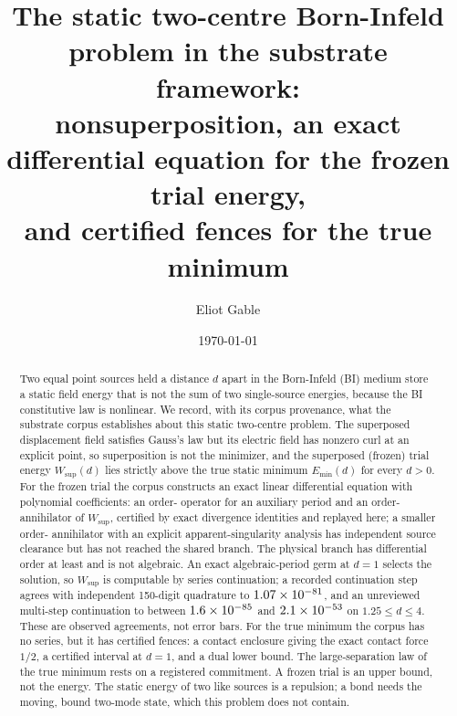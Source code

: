 \documentclass[aps,prd,onecolumn,amsmath,amssymb,longbibliography,floatfix,nofootinbib]{revtex4-2}
\newcommand{\Wsup}{W_{\mathrm{sup}}}
\newcommand{\Emin}{E_{\min}}
\begin{document}
\title{The static two-centre Born-Infeld problem in the substrate framework:\\
nonsuperposition, an exact differential equation for the frozen trial energy,\\
and certified fences for the true minimum}

\author{Eliot Gable}

\date{\today}

\begin{abstract}
Two equal point sources held a distance $d$ apart in the Born-Infeld (BI) medium store a static field energy that is not the sum of two single-source energies, because the BI constitutive law is nonlinear. We record, with its corpus provenance, what the substrate corpus establishes about this static two-centre problem. The superposed displacement field satisfies Gauss's law but its electric field has nonzero curl at an explicit point, so superposition is not the minimizer, and the superposed (frozen) trial energy $\Wsup(d)$ lies strictly above the true static minimum $\Emin(d)$ for every $d>0$. For the frozen trial the corpus constructs an exact linear differential equation with polynomial coefficients: an order-\ScalarOrderVal{} operator for an auxiliary period and an order-\EnergyOrderVal{} annihilator of $\Wsup$, certified by exact divergence identities and replayed here; a smaller order-\OrderSeventeenVal{} annihilator with an explicit apparent-singularity analysis has independent source clearance but has not reached the shared branch. The physical branch has differential order at least \SelectedLowerVal{} and is not algebraic. An exact algebraic-period germ at $d=1$ selects the solution, so $\Wsup$ is computable by series continuation; a recorded continuation step agrees with independent 150-digit quadrature to $1.07\times10^{-81}$, and an unreviewed multi-step continuation to between $1.6\times10^{-85}$ and $2.1\times10^{-53}$ on $1.25\le d\le4$. These are observed agreements, not error bars. For the true minimum the corpus has no series, but it has certified fences: a contact enclosure giving the exact contact force $1/2$, a certified interval at $d=1$, and a dual lower bound. The large-separation law of the true minimum rests on a registered commitment. A frozen trial is an upper bound, not the energy. The static energy of two like sources is a repulsion; a bond needs the moving, bound two-mode state, which this problem does not contain.
\end{abstract}
\end{document}
